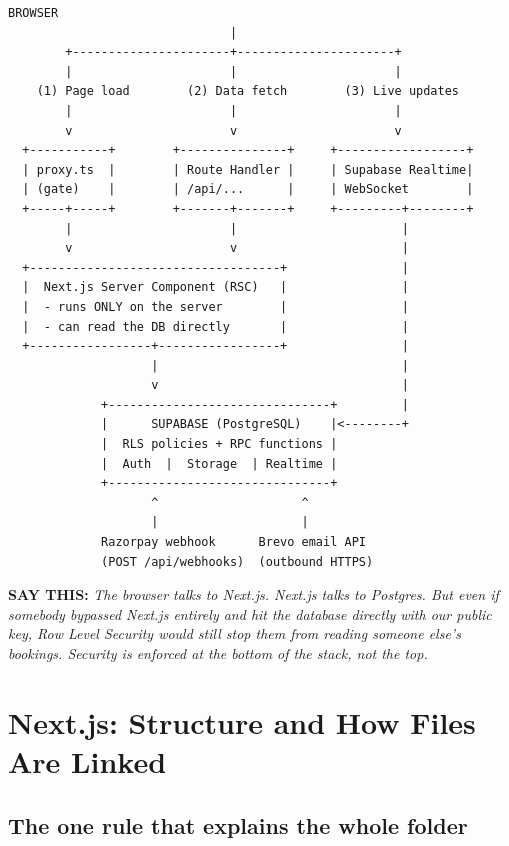 \documentclass[11pt,a4paper]{article}
\newcommand{\saythis}[1]{\begin{saybox}\textbf{\small\color{primary}SAY THIS:} \textit{#1}\end{saybox}}
\begin{document}
\begin{lstlisting}[basicstyle=\ttfamily\scriptsize]
                            BROWSER
                               |
        +----------------------+----------------------+
        |                      |                      |
    (1) Page load        (2) Data fetch        (3) Live updates
        |                      |                      |
        v                      v                      v
  +-----------+        +---------------+     +------------------+
  | proxy.ts  |        | Route Handler |     | Supabase Realtime|
  | (gate)    |        | /api/...      |     | WebSocket        |
  +-----+-----+        +-------+-------+     +---------+--------+
        |                      |                       |
        v                      v                       |
  +-----------------------------------+                |
  |  Next.js Server Component (RSC)   |                |
  |  - runs ONLY on the server        |                |
  |  - can read the DB directly       |                |
  +-----------------+-----------------+                |
                    |                                  |
                    v                                  |
             +-------------------------------+         |
             |      SUPABASE (PostgreSQL)    |<--------+
             |  RLS policies + RPC functions |
             |  Auth  |  Storage  | Realtime |
             +-------------------------------+
                    ^                    ^
                    |                    |
             Razorpay webhook      Brevo email API
             (POST /api/webhooks)  (outbound HTTPS)
\end{lstlisting}

\saythis{The browser talks to Next.js. Next.js talks to Postgres. But even if
somebody bypassed Next.js entirely and hit the database directly with our public
key, Row Level Security would still stop them from reading someone else's
bookings. Security is enforced at the bottom of the stack, not the top.}

\newpage
\section{Next.js: Structure and How Files Are Linked}

\subsection{The one rule that explains the whole folder}
\end{document}
